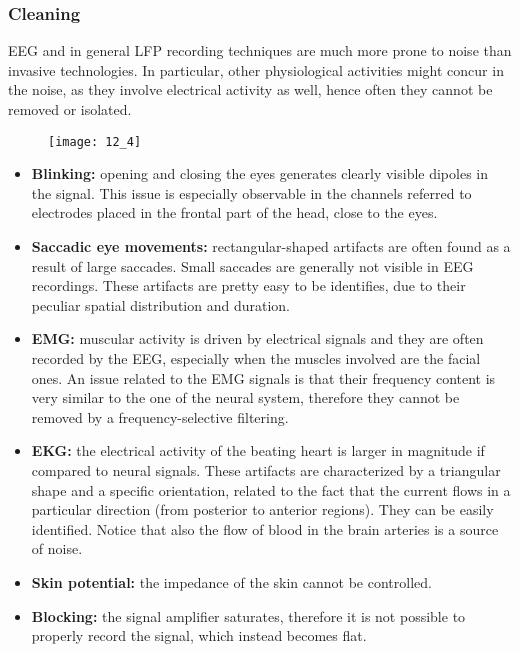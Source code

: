 \subsubsection{Cleaning}
EEG and in general LFP recording techniques are much more prone to noise than
invasive technologies. In particular, other physiological activities might concur
in the noise, as they involve electrical activity as well, hence often they cannot be removed or isolated.
\begin{figure}[H]
    \centering
    \texttt{[image: 12\_4]}
\end{figure}
\begin{itemize}
    \item \textbf{Blinking:} opening and closing the eyes generates clearly visible dipoles
          in the signal. This issue is especially observable in the channels referred to
          electrodes placed in the frontal part of the head, close to the eyes.
    \item \textbf{Saccadic eye movements:} rectangular-shaped artifacts are often found as a
          result of large saccades. Small saccades are generally not visible in EEG
          recordings. These artifacts are pretty easy to be identifies, due to their
          peculiar spatial distribution and duration.
    \item \textbf{EMG:} muscular activity is driven by electrical signals and they are often
          recorded by the EEG, especially when the muscles involved are the facial ones.
          An issue related to the EMG signals is that their frequency content is very similar
          to the one of the neural system, therefore they cannot be removed by a
          frequency-selective filtering.
    \item \textbf{EKG:} the electrical activity of the beating heart is larger in magnitude
          if compared to neural signals. These artifacts are characterized by a
          triangular shape and a specific orientation, related to the fact that the current flows
          in a particular direction (from posterior to anterior regions). They can be easily identified.
          Notice that also the flow of blood in the brain arteries is a source of noise.
    \item \textbf{Skin potential:} the impedance of the skin cannot be controlled.
    \item \textbf{Blocking:} the signal amplifier saturates, therefore it is not possible
          to properly record the signal, which instead becomes flat.
\end{itemize}
